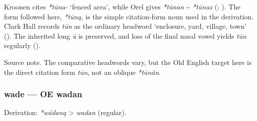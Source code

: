\documentclass[
  british,
  a4paper,
]{article}
\begin{document}
Kroonen cites \emph{*tūna-} `fenced area', while Orel gives
\emph{*tūnan} \textasciitilde{} \emph{*tūnaz}
(;
). The form followed here,
\emph{*tūną}, is the simple citation-form noun used in the derivation.
Clark Hall records \emph{tūn} as the ordinary headword `enclosure, yard,
village, town' (). The
inherited long \emph{ū} is preserved, and loss of the final nasal vowel
yields \emph{tūn} regularly ().

Source note. The comparative headwords vary, but the Old English target
here is the direct citation form \emph{tūn}, not an oblique
\emph{*tūnăn}.

\subsubsection{wade --- OE wadan}\label{wade-oe-wadan}

Derivation: \emph{*wádaną} \textgreater{} \emph{wadan} (regular).

\begingroup
\setlength{\fboxsep}{6pt}
\end{document}
